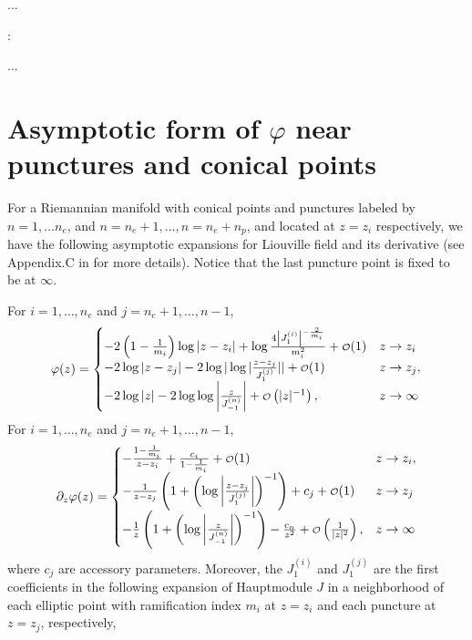 \documentclass[a4paper,11pt]{article}
\newcommand\smallO{
	\mathchoice
	{{\scriptstyle\mathcal{O}}}%
	{{\scriptstyle\mathcal{O}}}%
	{{\scriptscriptstyle\mathcal{O}}}%
	{\scalebox{.7}{$\scriptscriptstyle\mathcal{O}$}}%
}
\begin{document}
...

:

...

\appendix
\section{Asymptotic form of $\varphi$ near punctures and conical points}\label{asymapp}
For a Riemannian manifold with conical points and punctures labeled by $n=1,\dots n_e$, and $n=n_e+1,\dots, n= n_e+n_p$, and located at $z=z_i$ respectively, we have the following asymptotic expansions for Liouville field and its derivative (see Appendix.C in \cite{Taghavi2024classical} for more details). Notice that the last puncture point is fixed to be at $\infty$.

\noindent For $i=1, \ldots, n_e$ and $j=n_e+1, \ldots, n-1$,
\begin{equation}
\begin{aligned}
\varphi(z)= \begin{cases}-2\left(1-\frac{1}{m_i}\right) \log \left|z-z_i\right|+\log \frac{4\left|J_1^{(i)}\right|^{-\frac{2}{m_i}}}{m_i^2}+\smallO(1) & z \rightarrow z_i \\ -2 \log \left|z-z_j\right|-2 \log |\log | \frac{z-z_j}{J_1^{(j)}}||+\smallO(1) & z \rightarrow z_j, \\ -2 \log |z|-2 \log \log \left|\frac{z}{J_{-1}^{(n)}}\right|+\smallO\left(|z|^{-1}\right), & z \rightarrow \infty\end{cases}
\end{aligned}
\label{conicalasymp}
\end{equation}
 For $i=1, \ldots, n_e$ and $j=n_e+1, \ldots, n-1$,
\begin{equation}
\begin{aligned}
\partial_z \varphi(z)= \begin{cases}-\frac{1-\frac{1}{m_i}}{z-z_i}+\frac{c_i}{1-\frac{1}{m_i}}+\smallO(1) & z \rightarrow z_i, \\ -\frac{1}{z-z_j}\left(1+\left(\log \left|\frac{z-z_j}{J_1^{(j)}}\right|\right)^{-1}\right)+c_j+\smallO(1) & z \rightarrow z_j \\ -\frac{1}{z}\left(1+\left(\log \left|\frac{z}{J_{-1}^{(n)}}\right|\right)^{-1}\right)-\frac{c_n}{z^2}+\smallO\left(\frac{1}{|z|^2}\right), & z \rightarrow \infty\end{cases}
\end{aligned}
\label{derasymp}
\end{equation}
where $c_j$ are accessory parameters. Moreover, the $J_{1}^{(i)}$ and $J_{1}^{(j)}$  are the first coefficients in the following expansion of Hauptmodule $J$ in a neighborhood of each elliptic point with ramification index $m_i$ at $z=z_i$ and each puncture at  $z=z_j$, respectively, 
\end{document}
